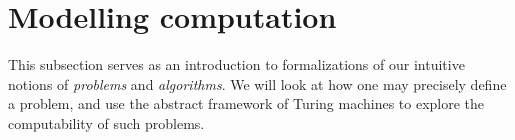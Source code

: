 \section{Modelling computation}

This subsection serves as an introduction to formalizations of our intuitive notions of \emph{problems} and \emph{algorithms}. We will look at how one may precisely define a problem, and use the abstract framework of Turing machines to explore the computability of such problems. 


